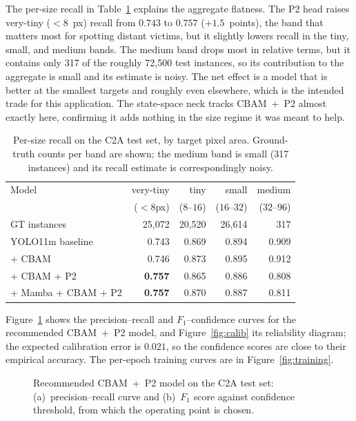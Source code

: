 The per-size recall in Table~\ref{tab:persize} explains the aggregate flatness. The
P2 head raises very-tiny ($<8$~px) recall from $0.743$ to $0.757$ ($+1.5$~points),
the band that matters most for spotting distant victims, but it slightly lowers
recall in the tiny, small, and medium bands. The medium band drops most in relative
terms, but it contains only 317 of the roughly 72{,}500 test instances, so its
contribution to the aggregate is small and its estimate is noisy. The net effect is
a model that is better at the smallest targets and roughly even elsewhere, which is
the intended trade for this application. The state-space neck tracks CBAM~+~P2
almost exactly here, confirming it adds nothing in the size regime it was meant to
help.

\begin{table}[tbp]
  \centering
  \caption{Per-size recall on the C2A test set, by target pixel area. Ground-truth
  counts per band are shown; the medium band is small (317 instances) and its
  recall estimate is correspondingly noisy.}
  \label{tab:persize}
  \begin{tabular}{@{}l r r r r@{}}
    \toprule
    Model & very-tiny & tiny & small & medium \\
    & ($<8$px) & ($8$--$16$) & ($16$--$32$) & ($32$--$96$) \\
    GT instances & 25{,}072 & 20{,}520 & 26{,}614 & 317 \\
    \midrule
    YOLO11m baseline    & 0.743 & 0.869 & 0.894 & 0.909 \\
    + CBAM              & 0.746 & 0.873 & 0.895 & 0.912 \\
    + CBAM + P2         & \textbf{0.757} & 0.865 & 0.886 & 0.808 \\
    + Mamba + CBAM + P2 & \textbf{0.757} & 0.870 & 0.887 & 0.811 \\
    \bottomrule
  \end{tabular}
\end{table}

Figure~\ref{fig:curves} shows the precision--recall and $F_1$--confidence curves for
the recommended CBAM~+~P2 model, and Figure~\ref{fig:calib} its reliability
diagram; the expected calibration error is $0.021$, so the confidence scores are
close to their empirical accuracy. The per-epoch training curves are in
Figure~\ref{fig:training}.

\begin{figure}[tbp]
  \centering
  \begin{minipage}{0.49\linewidth}\centering
  \end{minipage}\hfill
  \begin{minipage}{0.49\linewidth}\centering
  \end{minipage}
  \caption{Recommended CBAM~+~P2 model on the C2A test set: (a)~precision--recall
  curve and (b)~$F_1$ score against confidence threshold, from which the operating
  point is chosen.}
  \label{fig:curves}
\end{figure}

